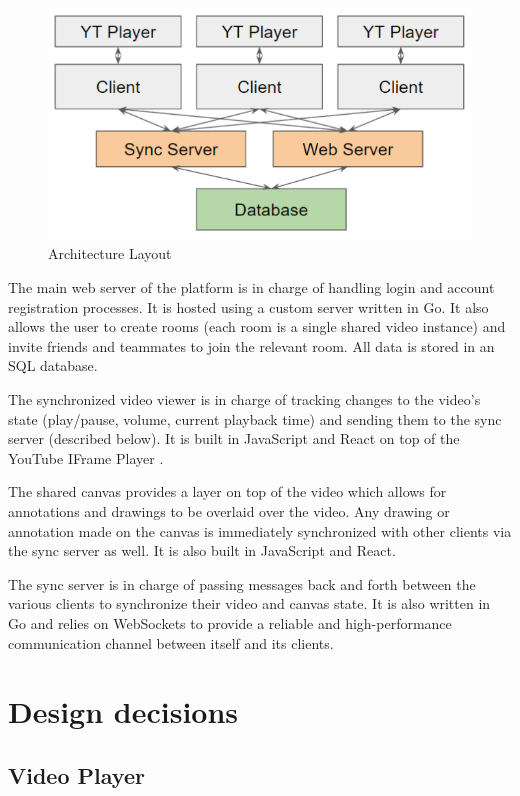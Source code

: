 \documentclass[conference]{IEEEtran}
\begin{document}
  \begin{figure}[H]
      \centering
      \includegraphics[width=\linewidth]{figure1.PNG}
      \caption{Architecture Layout}
      \label{fig:my_label}
  \end{figure}

  The main web server of the platform is in charge of handling login and account registration processes. It is hosted using a custom server written in Go. It also allows the user to create rooms (each room is a single shared video instance) and invite friends and teammates to join the relevant room. All data is stored in an SQL database.

  The synchronized video viewer is in charge of tracking changes to the video's state (play/pause, volume, current playback time) and sending them to the sync server (described below). It is built in JavaScript and React on top of the YouTube IFrame Player \cite{ytplayerwebsite}.

  The shared canvas provides a layer on top of the video which allows for annotations and drawings to be overlaid over the video. Any drawing or annotation made on the canvas is immediately synchronized with other clients via the sync server as well. It is also built in JavaScript and React.

  The sync server is in charge of passing messages back and forth between the various clients to synchronize their video and canvas state. It is also written in Go and relies on WebSockets to provide a reliable and high-performance communication channel between itself and its clients.

\section{Design decisions}

\subsection{Video Player}
\end{document}
